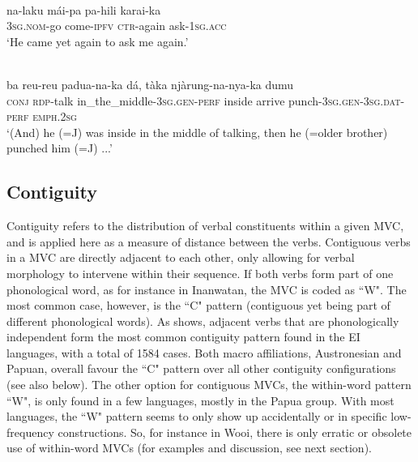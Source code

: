 \ea \label{kambera001}
\\
\gll na-laku mái-pa pa-hili karai-ka \\
3\textsc{sg}.\textsc{nom}-go come-\textsc{ipfv} \textsc{ctr}-again ask-1\textsc{sg}.\textsc{acc} \\
\glft `He came yet again to ask me again.'\\ 
\z

\ea \label{kambera002}
\\
\gll ba reu-reu padua-na-ka dá, tàka njàrung-na-nya-ka dumu \\
\textsc{conj} \textsc{rdp}-talk in\_the\_middle-3\textsc{sg}.\textsc{gen}-\textsc{perf} inside arrive punch-3\textsc{sg}.\textsc{gen}-3\textsc{sg}.\textsc{dat}-\textsc{perf} \textsc{emph}.2\textsc{sg} \\
\glft `(And) he (=J) was inside in the middle of talking, then he (=older brother) punched him (=J) ...'\\ 
\z

\subsection{Contiguity}\label{sec:contiguity}

Contiguity refers to the distribution of verbal constituents within a given MVC, and is applied here as a measure of distance between the verbs. Contiguous verbs in a MVC are directly adjacent to each other, only allowing for verbal morphology to intervene within their sequence. If both verbs form part of one phonological word, as for instance in Inanwatan, the MVC is coded as ``W". The most common case, however, is the ``C" pattern (contiguous yet being part of different phonological words). As  shows, adjacent verbs that are phonologically independent form the most common contiguity pattern found in the EI languages, with a total of 1584 cases. Both macro affiliations, Austronesian and Papuan, overall favour the ``C" pattern over all other contiguity configurations (see also  below). The other option for contiguous MVCs, the within-word pattern ``W", is only found in a few languages, mostly in the Papua group. With most languages, the ``W" pattern seems to only show up accidentally or in specific low-frequency constructions. So, for instance in Wooi, there is only erratic or obsolete use of within-word MVCs (for examples and discussion, see next section).

